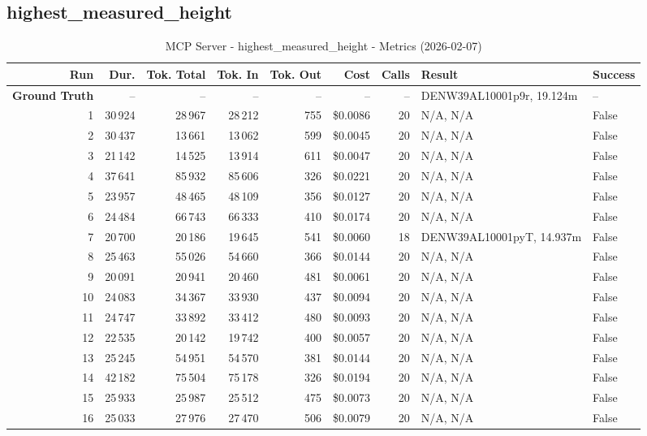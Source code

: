 \documentclass[a4paper,11pt]{article}
\begin{document}
\clearpage
\subsection{highest\_measured\_height}

\begin{table}[ht]
\centering
\scriptsize
\caption{MCP Server - highest\_measured\_height - Metrics (2026-02-07)}
\label{tab:mcp\_highest\_measured\_height\_metrics\_2026-02-07}
\begin{tabular}{r r r r r r r p{3cm} l}
\hline
Run & Dur. & Tok. Total & Tok. In & Tok. Out & Cost & Calls & Result & Success \\
\hline
\textbf{Ground Truth} & -- & -- & -- & -- & -- & -- & DENW39AL10001p9r, 19.124m & -- \\
1 & 30\,924 & 28\,967 & 28\,212 & 755 & \$0.0086 & 20 & N/A, N/A & False \\
2 & 30\,437 & 13\,661 & 13\,062 & 599 & \$0.0045 & 20 & N/A, N/A & False \\
3 & 21\,142 & 14\,525 & 13\,914 & 611 & \$0.0047 & 20 & N/A, N/A & False \\
4 & 37\,641 & 85\,932 & 85\,606 & 326 & \$0.0221 & 20 & N/A, N/A & False \\
5 & 23\,957 & 48\,465 & 48\,109 & 356 & \$0.0127 & 20 & N/A, N/A & False \\
6 & 24\,484 & 66\,743 & 66\,333 & 410 & \$0.0174 & 20 & N/A, N/A & False \\
7 & 20\,700 & 20\,186 & 19\,645 & 541 & \$0.0060 & 18 & DENW39AL10001pyT, 14.937m & False \\
8 & 25\,463 & 55\,026 & 54\,660 & 366 & \$0.0144 & 20 & N/A, N/A & False \\
9 & 20\,091 & 20\,941 & 20\,460 & 481 & \$0.0061 & 20 & N/A, N/A & False \\
10 & 24\,083 & 34\,367 & 33\,930 & 437 & \$0.0094 & 20 & N/A, N/A & False \\
11 & 24\,747 & 33\,892 & 33\,412 & 480 & \$0.0093 & 20 & N/A, N/A & False \\
12 & 22\,535 & 20\,142 & 19\,742 & 400 & \$0.0057 & 20 & N/A, N/A & False \\
13 & 25\,245 & 54\,951 & 54\,570 & 381 & \$0.0144 & 20 & N/A, N/A & False \\
14 & 42\,182 & 75\,504 & 75\,178 & 326 & \$0.0194 & 20 & N/A, N/A & False \\
15 & 25\,933 & 25\,987 & 25\,512 & 475 & \$0.0073 & 20 & N/A, N/A & False \\
16 & 25\,033 & 27\,976 & 27\,470 & 506 & \$0.0079 & 20 & N/A, N/A & False \\

\end{tabular}
\end{table}
\end{document}
